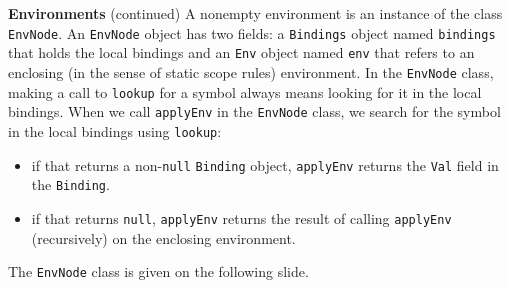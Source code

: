 \begin{minipage}[t]{\sw}
\slidenumber
\LARGE
{\bf Environments} (continued)\exx
A nonempty environment is an instance of the class \verb'EnvNode'.
An \verb'EnvNode' object has two fields:
a \verb'Bindings' object named \verb'bindings' that holds the local bindings
and an \verb'Env' object named \verb'env' that refers
to an enclosing (in the sense of static scope rules) environment.\exx
In the \verb'EnvNode' class,
making a call to \verb'lookup' for a symbol always means
looking for it in the local bindings.\exx
When we call \verb'applyEnv' in the \verb'EnvNode' class,
we search for the symbol in the local bindings using \verb'lookup':
\begin{itemize}
\item if that returns a non-\verb'null' \verb'Binding' object,
    \verb'applyEnv' returns the \verb'Val' field in the \verb'Binding'.
\item if that returns \verb'null',
    \verb'applyEnv' returns the result
    of calling \verb'applyEnv' (recursively) on the enclosing environment.
\end{itemize}
The \verb'EnvNode' class is given on the following slide.
\end{minipage}
\clearpage
